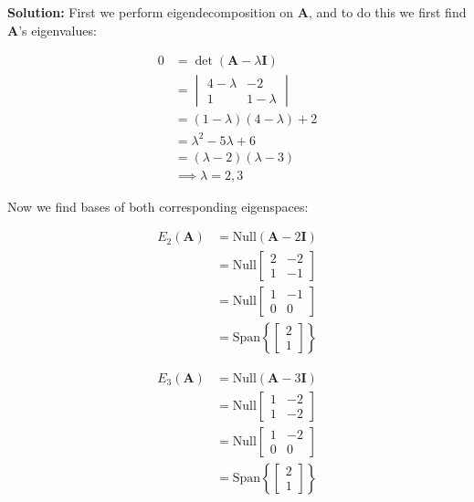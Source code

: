 \documentclass{article}
\begin{document}
\noindent\textbf{Solution:} First we perform eigendecomposition on $\mathbf{A}$, and to do this we first find $\mathbf{A}$'s eigenvalues:

\begin{align*}
    0&=\det(\mathbf{A}-\lambda \mathbf{I})\\
    &=\begin{vmatrix} 4-\lambda & -2 \\ 1 & 1-\lambda \end{vmatrix}\\
    &=(1-\lambda)(4-\lambda)+2\\
    &=\lambda^2-5\lambda+6\\
    &=(\lambda-2)(\lambda-3)\\
    &\implies \lambda=2,3
\end{align*}
\pagebreak

Now we find bases of both corresponding eigenspaces:

\begin{align*}
    E_2(\mathbf{A})&=\text{Null}(\mathbf{A}-2\mathbf{I})\tag{def. of eigenspace}\\
    &=\text{Null}\begin{bmatrix} 2 & -2 \\ 1 & -1 \end{bmatrix}\\
    &=\text{Null}\begin{bmatrix} 1 & -1 \\ 0 & 0 \end{bmatrix}\tag{ref}\\
    &=\text{Span}\left\{\begin{bmatrix} 2\\1\end{bmatrix}\right\}\tag{$x_1=x_2$}
\end{align*}

\begin{align*}
    E_3(\mathbf{A})&=\text{Null}(\mathbf{A}-3\mathbf{I})\tag{def. of eigenspace}\\
    &=\text{Null}\begin{bmatrix} 1 & -2 \\ 1 & -2 \end{bmatrix}\\
    &=\text{Null}\begin{bmatrix} 1 & -2 \\ 0 & 0 \end{bmatrix}\tag{ref}\\
    &=\text{Span}\left\{\begin{bmatrix} 2\\1\end{bmatrix}\right\}\tag{$x_1=2x_2$}
\end{align*}
\end{document}
